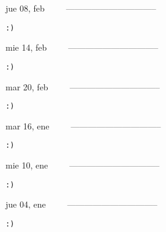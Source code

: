 \documentclass[letterpaper,10pt]{article}
\begin{document}
\begin{multicols}{3}
{jue 08, feb\ \ \ \ \ --------------------------------}
\begin{flushright}\begin{small}\texttt{:)}\end{small}\end{flushright}
\vfill
{mie 14, feb\ \ \ \ \ --------------------------------}
\begin{flushright}\begin{small}\texttt{:)}\end{small}\end{flushright}\par
\vfill
{mar 20, feb\ \ \ \ \ --------------------------------}
\begin{flushright}\begin{small}\texttt{:)}\end{small}\end{flushright}\par
\vfill
\end{multicols}
\vspace{1.05cm}

\begin{multicols}{3}
{mar 16, ene\ \ \ \ \ --------------------------------}
\begin{flushright}\begin{small}\texttt{:)}\end{small}\end{flushright}
\vfill
{mie 10, ene\ \ \ \ \ --------------------------------}
\begin{flushright}\begin{small}\texttt{:)}\end{small}\end{flushright}\par
\vfill
{jue 04, ene\ \ \ \ \ --------------------------------}
\begin{flushright}\begin{small}\texttt{:)}\end{small}\end{flushright}\par
\vfill
\end{multicols}
\vspace{1.05cm}
\end{document}
